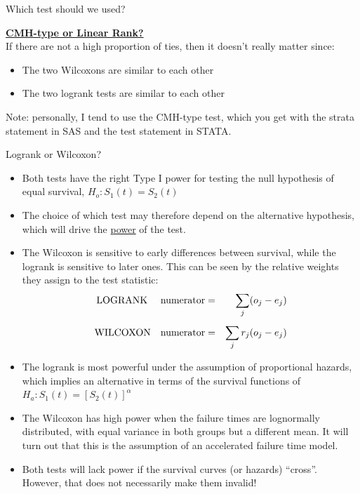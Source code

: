 \documentclass[envcountsect, 10pt, portrait, palatino]{beamer}
\begin{document}
\begin{frame}{Which test should we used?}

\underline{\bf CMH-type or Linear Rank?}\\
If there are not a high proportion of ties, then it doesn't
really matter since:
\begin{itemize}
\item  The two Wilcoxons are similar to each other
\item  The two logrank tests are similar to each other
\end{itemize}
{ Note: personally, I tend to use the CMH-type test, which
you get with the {\sc strata} statement in SAS and the {\sc test}
statement in STATA.}
\end{frame}

\begin{frame}{Logrank or Wilcoxon?}
\begin{itemize}
\item Both tests have the right Type I power for testing the null
hypothesis of equal survival, $H_o: S_1(t)=S_2(t)$

\item The choice of which test may therefore depend on the alternative
hypothesis, which will drive the \underline{power} of the test.
\item The Wilcoxon is sensitive to early differences between survival,
while the logrank is sensitive to later ones.  This can be seen by
the relative weights they assign to the test statistic:
\begin{eqnarray*}
\mbox{LOGRANK} ~~~~ {\rm numerator} & = & \sum_j (o_j - e_j)\\[1ex]
\mbox{WILCOXON} ~~~ {\rm numerator} & = & \sum_j r_j (o_j - e_j)\\
\end{eqnarray*}
\end{itemize}
\end{frame}

\begin{frame}
\begin{itemize}
\item The logrank is most powerful under the assumption of
proportional hazards, which implies an alternative in terms
of the survival functions of $H_a: S_1(t)=[S_2(t)]^{\alpha}$
\item The Wilcoxon has high power when the failure times are
lognormally distributed, with equal variance in both groups but a
different mean.  It will turn out that this is the assumption of
an accelerated failure time model.
\item  Both tests will lack power if the survival curves
(or hazards) ``cross''.  However, that does not necessarily
make them invalid!
\end{itemize}

\end{frame}
\end{document}
